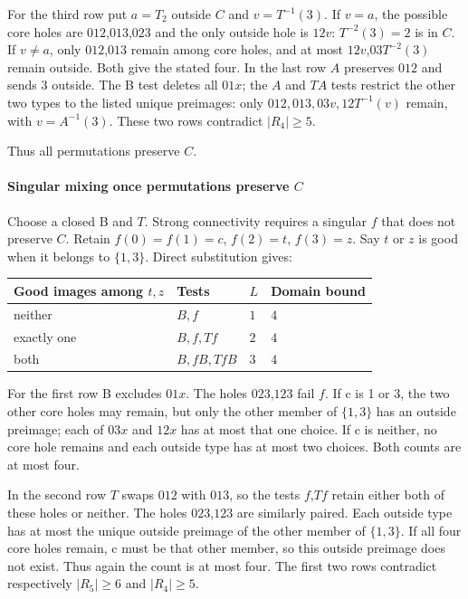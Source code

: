 \documentclass[11pt]{article}
\theoremstyle{definition}
\theoremstyle{plain}
\begin{document}
For the third row put \(a=T_{2}\) outside \(C\) and \(v=T^{-1}(3)\). If
\(v=a\), the possible core holes are \(012\),\(013\),\(023\) and the only outside
hole is \(12v\): \(T^{-2}(3)=2\) is in \(C\). If \(v\ne a\), only
\(012\),\(013\) remain among core holes, and at most \(12v\),\(03\)\(T^{-2}(3)\)
remain outside. Both give the stated four. In the last row \(A\)
preserves \(012\) and sends 3 outside. The B test deletes all \(01x\); the
\(A\) and \(TA\) tests restrict the other two types to the listed unique
preimages: only \(012,013,03v,12T^{-1}(v)\) remain, with \(v=A^{-1}(3)\). These two rows contradict \(|R_{4}|\ge 5\).

Thus all permutations preserve \(C\).

\paragraph{Singular mixing once permutations preserve
\(C\)}\label{singular-mixing-once-permutations-preserve-c}

Choose a closed B and \(T\). Strong connectivity requires a
singular \(f\) that does not preserve \(C\). Retain \(f(0)=f(1)=c\),
\(f(2)=t\), \(f(3)=z\). Say \(t\) or \(z\) is good when it belongs to
\(\{1,3\}\). Direct substitution gives:

\begin{center}
\begin{tabular}{llll}
\toprule
Good images among \(t,z\) &  Tests  & \(L\) &  Domain bound \\
\midrule

neither & \(B,f\) & \(1\) & \(4\)\\
exactly one & \(B,f,Tf\) & \(2\) & \(4\)\\
both & \(B,fB,TfB\) & \(3\) & \(4\)\\
\bottomrule
\end{tabular}
\end{center}

For the first row B excludes \(01x\). The holes \(023\),\(123\) fail \(f\). If c
is 1 or 3, the two other core holes may remain, but only the other
member of \(\{1,3\}\) has an outside preimage; each of \(03x\) and \(12x\)
has at most that one choice. If c is neither, no core hole remains and
each outside type has at most two choices. Both counts are at most four.

In the second row \(T\) swaps \(012\) with \(013\), so the tests \(f\),\(Tf\) retain
either both of these holes or neither. The holes \(023\),\(123\) are similarly
paired. Each outside type has at most the unique outside preimage of the
other member of \(\{1,3\}\). If all four core holes remain, c must be that
other member, so this outside preimage does not exist. Thus again the
count is at most four. The first two rows contradict respectively
\(|R_{5}|\ge 6\) and \(|R_{4}|\ge 5\).
\end{document}
